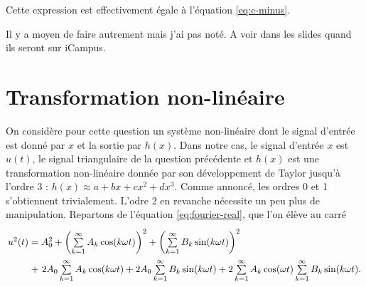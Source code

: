 Cette expression est effectivement égale à
l'équation \ref{eq:c-minus}.

\begin{correction}
	Il y a moyen de faire autrement mais j'ai pas noté.
	A voir dans les slides quand ils seront sur iCampus.
\end{correction}

\section{Transformation non-linéaire}

On considère pour cette question un système non-linéaire
dont le signal d'entrée est donné par $x$ et la sortie
par $h(x)$.
Dans notre cas, le signal d'entrée $x$ est $u(t)$,
le signal triangulaire de la question précédente et
$h(x)$ est une transformation non-linéaire donnée par
son développement de Taylor jusqu'à l'ordre 3 :
$h(x) \approx a+bx+cx^2+dx^3$.
Comme annoncé, les ordres 0 et 1 s'obtiennent trivialement.
L'odre 2 en revanche nécessite un peu plus de manipulation.
Repartons de l'équation \ref{eq:fourier-real}, que l'on
élève au carré
\[\arraycolsep=1.4pt\def\arraystretch{2.2}
	\begin{array}{cl}
		 u^2(t)	&= A_0^2 + \left(\sum\limits_{k=1}^\infty A_k\cos(k\omega t)\right)^2 + \left(\sum\limits_{k=1}^\infty B_k\sin(k\omega t)\right)^2\\ 
						&+~ 2A_0\sum\limits_{k=1}^\infty A_k\cos(k\omega t) + 2A_0\sum\limits_{k=1}^\infty B_k\sin(k\omega t)
						+ 2\sum\limits_{k=1}^\infty A_k\cos(\omega t)\sum\limits_{k=1}^{\infty}B_k\sin(k\omega t). 
	\end{array}
\]

